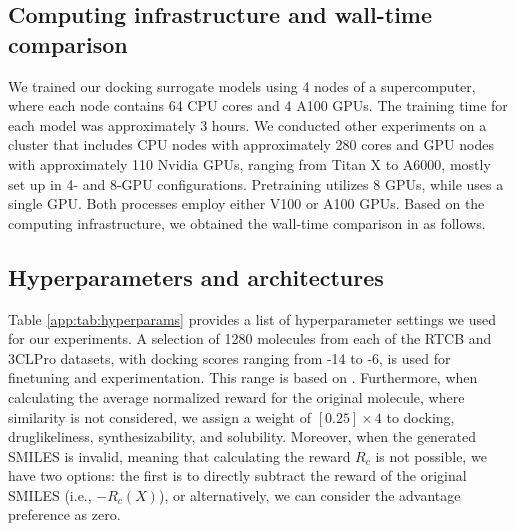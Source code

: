 \subsection{Computing infrastructure {and wall-time comparison}}\label{app:computing_infrastructure}

{We trained our docking surrogate models using 4 nodes of a supercomputer, where each node contains 64 CPU cores and 4 A100 GPUs. The training time for each model was approximately 3 hours.
We conducted other experiments on a cluster that includes CPU nodes with approximately 280 cores and GPU nodes with approximately 110 Nvidia GPUs, ranging from Titan X to A6000, mostly set up in 4- and 8-GPU configurations. 
Pretraining utilizes 8 GPUs, while \algname uses a single GPU. Both processes employ either V100 or A100 GPUs. Based on the computing infrastructure, we obtained the wall-time comparison in  as follows.
}

 \begin{table*}[ht!]
 {
    \centering
    {\scriptsize
    }
    \caption{{Wall-time comparison between different methods.} }
        \label{table:wall-time}   
        }
\end{table*}


\subsection{Hyperparameters and architectures}\label{app:hyperparameters}
Table \ref{app:tab:hyperparams} provides a list of hyperparameter settings we used for our experiments.
A selection of 1280 molecules from each of the RTCB and 3CLPro datasets, with docking scores ranging from -14 to -6, is used for \algname finetuning and experimentation. This range is based on \citep{liu2024erp}.
{Furthermore, when calculating the average normalized reward for the original molecule, where similarity is not considered, we assign a weight of $[0.25] \times 4$ to docking, druglikeliness, synthesizability, and solubility.}
{Moreover, when the generated SMILES is invalid, meaning that calculating the reward $R_c$ is not possible, we have two options: the first is to directly subtract the reward of the original SMILES (i.e., $-R_c(X)$), or alternatively, we can consider the advantage preference as zero.}

